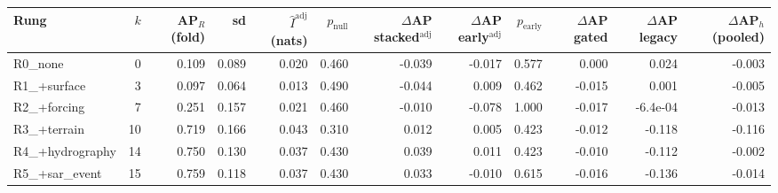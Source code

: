 \begin{tabular}{lrrrrrrrrrrr}
\toprule
Rung & $k$ & AP$_R$ (fold) & sd & $\hat I^{\mathrm{adj}}$ (nats) & $p_{\mathrm{null}}$ & $\Delta$AP stacked$^{\mathrm{adj}}$ & $\Delta$AP early$^{\mathrm{adj}}$ & $p_{\mathrm{early}}$ & $\Delta$AP gated & $\Delta$AP legacy & $\Delta$AP$_h$ (pooled) \\
\midrule
R0\_none & 0 & 0.109 & 0.089 & 0.020 & 0.460 & -0.039 & -0.017 & 0.577 & 0.000 & 0.024 & -0.003 \\
R1\_+surface & 3 & 0.097 & 0.064 & 0.013 & 0.490 & -0.044 & 0.009 & 0.462 & -0.015 & 0.001 & -0.005 \\
R2\_+forcing & 7 & 0.251 & 0.157 & 0.021 & 0.460 & -0.010 & -0.078 & 1.000 & -0.017 & -6.4e-04 & -0.013 \\
R3\_+terrain & 10 & 0.719 & 0.166 & 0.043 & 0.310 & 0.012 & 0.005 & 0.423 & -0.012 & -0.118 & -0.116 \\
R4\_+hydrography & 14 & 0.750 & 0.130 & 0.037 & 0.430 & 0.039 & 0.011 & 0.423 & -0.010 & -0.112 & -0.002 \\
R5\_+sar\_event & 15 & 0.759 & 0.118 & 0.037 & 0.430 & 0.033 & -0.010 & 0.615 & -0.016 & -0.136 & -0.014 \\
\bottomrule
\end{tabular}
